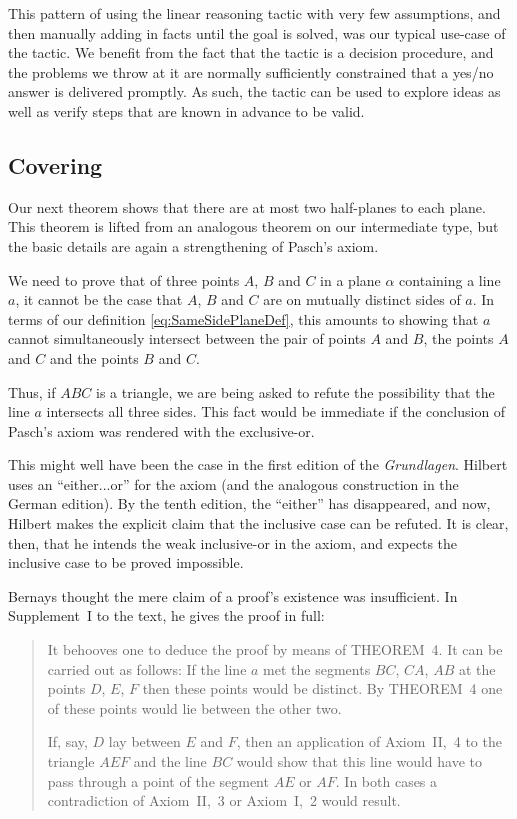 This pattern of using the linear reasoning tactic with very few assumptions, and then manually adding in facts until the goal is solved, was our typical use-case of the tactic. We benefit from the fact that the tactic is a decision procedure, and the problems we throw at it are normally sufficiently constrained that a yes/no answer is delivered promptly. As such, the tactic can be used to explore ideas as well as verify steps that are known in advance to be valid.

\subsection{Covering}
Our next theorem shows that there are at most two half-planes to each plane. This theorem is lifted from an analogous theorem on our intermediate type, but the basic details are again a strengthening of Pasch's axiom.

We need to prove that of three points $A$, $B$ and $C$ in a plane $\alpha$ containing a line $a$, it cannot be the case that $A$, $B$ and $C$ are on mutually distinct sides of $a$. In terms of our definition \eqref{eq:SameSidePlaneDef}, this amounts to showing that $a$ cannot simultaneously intersect between the pair of points $A$ and $B$, the points $A$ and $C$ and the points $B$ and $C$. 

\label{sec:PaschInclusiveOr}Thus, if $ABC$ is a triangle, we are being asked to refute the possibility that the line $a$ intersects all three sides. This fact would be immediate if the conclusion of Pasch's axiom was rendered with the exclusive-or. 

This might well have been the case in the first edition of the \emph{Grundlagen}. Hilbert uses an ``either...or'' for the axiom (and the analogous construction in the German edition). By the tenth edition, the ``either'' has disappeared, and now, Hilbert makes the explicit claim that the inclusive case can be refuted. It is clear, then, that he intends the weak inclusive-or in the axiom, and expects the inclusive case to be proved impossible.

Bernays thought the mere claim of a proof's existence was insufficient. In Supplement~I to the text, he gives the proof in full:

\begin{quotation}\label{sec:SupplementI}
It behooves one to deduce the proof by means of THEOREM~4. It can be carried out as follows: If the line $a$ met the segments $BC$, $CA$, $AB$ at the points $D$, $E$, $F$ then these points would be distinct. By THEOREM~4 one of these points would lie between the other two.

If, say, $D$ lay between $E$ and $F$, then an application of Axiom~II,~4 to the triangle $AEF$ and the line $BC$ would show that this line would have to pass through a point of the segment $AE$ or $AF$. In both cases a contradiction of Axiom~II,~3 or Axiom~I,~2 would result.
\end{quotation}

